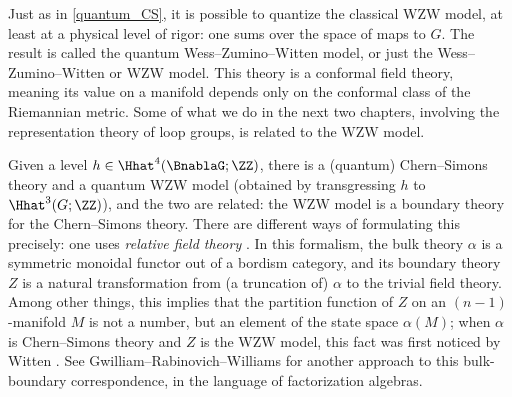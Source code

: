 \begin{remark}
	\label{quantum_WZW}
	Just as in \cref{quantum_CS}, it is possible to quantize the classical WZW model, at least at a physical level of
	rigor: one sums over the space of maps to $G$. The result is called the quantum Wess--Zumino--Witten model, or just
	the Wess--Zumino--Witten or WZW model. This theory is a
	conformal field theory,~ meaning its value on a manifold depends only
	on the conformal class of the Riemannian metric. Some of what we do in the next two chapters, involving the
	representation theory of loop groups, is related to the WZW model.

	Given a level $h\in\Hhat^4(\BnablaG;\ZZ)$, there is a (quantum) Chern--Simons theory and a quantum WZW model
	(obtained by transgressing $h$ to $\Hhat^3(G;\ZZ)$), and the two are related: the WZW model is a boundary theory
	for the Chern--Simons theory. There are different ways of formulating this precisely: one uses \textit{relative
	field theory} \cite{FT12}. In this formalism, the bulk theory $\alpha$
	is a symmetric monoidal functor out of a bordism category, and its boundary theory $Z$ is a natural transformation
	from (a truncation of) $\alpha$ to the trivial field theory. Among other things, this implies that the partition
	function of $Z$ on an $(n-1)$-manifold $M$ is not a number, but an element of the state space $\alpha(M)$; when
	$\alpha$ is Chern--Simons theory and $Z$ is the WZW model, this fact was first noticed by Witten \cite{Wit89}.
	See Gwilliam--Rabinovich--Williams \cite{GRW20} for another approach to this bulk-boundary correspondence, in the
	language of factorization algebras.
\end{remark}


